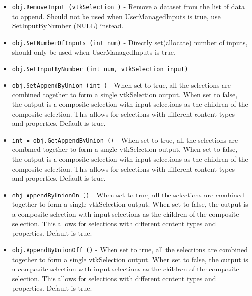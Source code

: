 \begin{itemize}
\item  \verb|obj.RemoveInput (vtkSelection )| -  Remove a dataset from the list of data to append. Should not be
 used when UserManagedInputs is true, use SetInputByNumber (NULL) instead.

\item  \verb|obj.SetNumberOfInputs (int num)| -  Directly set(allocate) number of inputs, should only be used
 when UserManagedInputs is true.

\item  \verb|obj.SetInputByNumber (int num, vtkSelection input)|

\item  \verb|obj.SetAppendByUnion (int )| -  When set to true, all the selections are combined together to form a single
 vtkSelection output.
 When set to false, the output is a composite selection with 
 input selections as the children of the composite selection. This allows
 for selections with different content types and properties. Default is
 true. 

\item  \verb|int = obj.GetAppendByUnion ()| -  When set to true, all the selections are combined together to form a single
 vtkSelection output.
 When set to false, the output is a composite selection with 
 input selections as the children of the composite selection. This allows
 for selections with different content types and properties. Default is
 true. 

\item  \verb|obj.AppendByUnionOn ()| -  When set to true, all the selections are combined together to form a single
 vtkSelection output.
 When set to false, the output is a composite selection with 
 input selections as the children of the composite selection. This allows
 for selections with different content types and properties. Default is
 true. 

\item  \verb|obj.AppendByUnionOff ()| -  When set to true, all the selections are combined together to form a single
 vtkSelection output.
 When set to false, the output is a composite selection with 
 input selections as the children of the composite selection. This allows
 for selections with different content types and properties. Default is
 true. 

\end{itemize}
